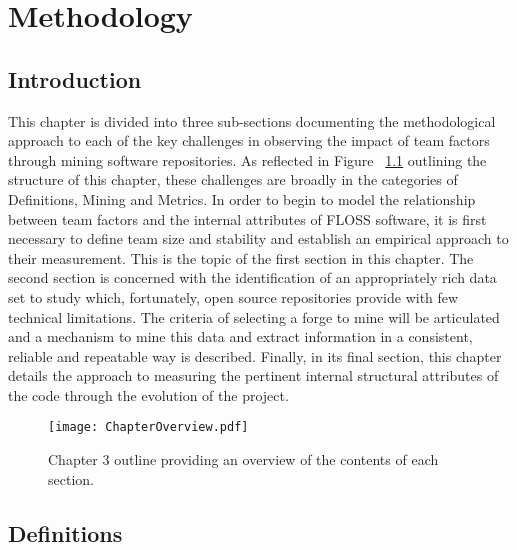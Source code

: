 
\graphicspath{{Chapter3/Figures/}{Chapter3/Tables/}{Chapter3/Charts/}}

\chapter{Methodology}

\section{Introduction} %

This chapter is divided into three sub-sections documenting the methodological approach to each of the key challenges in observing the impact of team factors through mining software repositories. As reflected in Figure ~\ref{fig:chapteroverview} outlining the structure of this chapter, these challenges are broadly in the categories of Definitions, Mining and Metrics. In order to begin to model the relationship between team factors and the internal attributes of FLOSS software, it is first necessary to define team size and stability and establish an empirical approach to their measurement. This is the topic of the first section in this chapter. The second section is concerned with the identification of an appropriately rich data set to study which, fortunately, open source repositories provide with few technical limitations. The criteria of selecting a forge to mine will be articulated and a mechanism to mine this data and extract information in a consistent, reliable and repeatable way is described. Finally, in its final section, this chapter details the approach to measuring the pertinent internal structural attributes of the code through the evolution of the project. 
 
\begin{landscape}
\begin{figure}[htbp!] 
\centering    
\texttt{[image: ChapterOverview.pdf]}
\caption{Chapter 3 outline providing an overview of the contents of each section.}
\label{fig:chapteroverview}
\end{figure}
\end{landscape}

\section{Definitions} %
